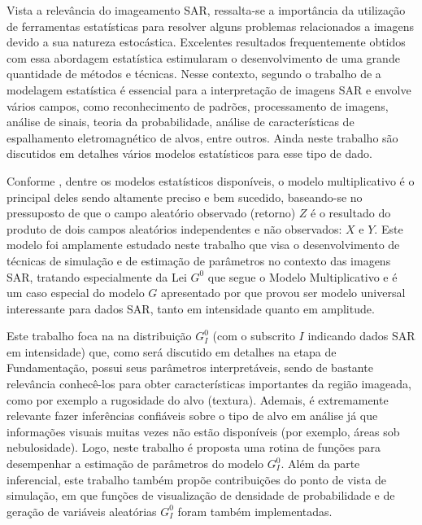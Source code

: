 Vista a relevância do imageamento SAR, ressalta-se a importância da utilização de ferramentas estatísticas para resolver alguns problemas relacionados a imagens devido a sua natureza estocástica. 
Excelentes resultados frequentemente obtidos com essa abordagem estatística estimularam o desenvolvimento de uma grande quantidade de métodos e técnicas. 
Nesse contexto, segundo o trabalho de \citet{Gao2010StatisticalMO} a modelagem estatística é essencial para a interpretação de imagens SAR e envolve vários campos, como reconhecimento de padrões, processamento de imagens, análise de sinais, teoria da probabilidade, análise de características de espalhamento eletromagnético de alvos, entre outros. 
Ainda neste trabalho são discutidos em detalhes vários modelos estatísticos para esse tipo de dado.

Conforme \citet{Mejail2002}, dentre os modelos estatísticos disponíveis, o modelo multiplicativo é o principal deles sendo altamente preciso e bem sucedido, baseando-se no pressuposto de que o campo aleatório observado (retorno) $Z$ é o resultado do produto de dois campos aleatórios independentes e não observados: $X$ e $Y$. 
Este modelo foi amplamente estudado neste trabalho que visa o desenvolvimento de técnicas de simulação e de estimação de parâmetros no contexto das imagens SAR, tratando especialmente da Lei $G^{0}$ que segue o Modelo Multiplicativo e é um caso especial do modelo $G$ apresentado por \citet{Clutter1997} que provou ser modelo universal interessante para dados SAR, tanto em intensidade quanto em amplitude.

Este trabalho foca na na distribuição $G_I^0$ (com o subscrito $I$ indicando dados SAR em intensidade) que, como será discutido em detalhes na etapa de Fundamentação, possui seus parâmetros interpretáveis, sendo de bastante relevância conhecê-los para obter características importantes da região imageada, como por exemplo a rugosidade do alvo (textura). 
Ademais, é extremamente relevante fazer inferências confiáveis sobre o tipo de alvo em análise já que informações visuais muitas vezes não estão disponíveis (por exemplo, áreas sob nebulosidade). 
Logo, neste trabalho é proposta uma rotina de funções para desempenhar a estimação de parâmetros do modelo $G_I^0$. 
Além da parte inferencial, este trabalho também propõe contribuições do ponto de vista de simulação, em que funções de visualização de densidade de probabilidade e de geração de variáveis aleatórias $G_I^0$ foram também implementadas. 

